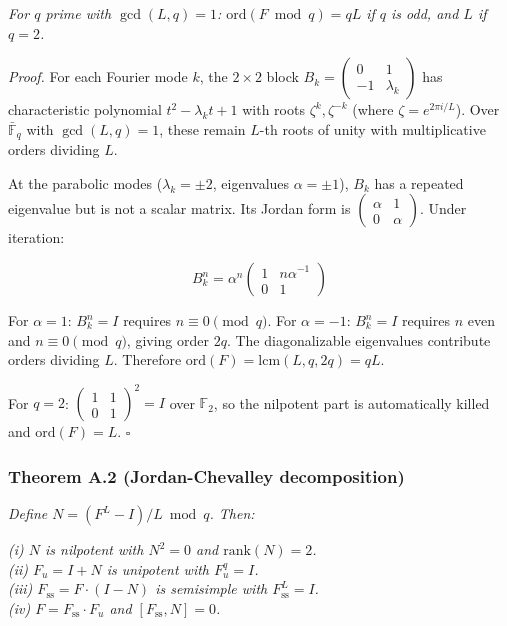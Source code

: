 \documentclass[
  11pt,
]{article}
\begin{document}
\emph{For \(q\) prime with \(\gcd(L, q) = 1\):
\(\mathrm{ord}(F \bmod q) = qL\) if \(q\) is odd, and \(L\) if
\(q = 2\).}

\emph{Proof.} For each Fourier mode \(k\), the \(2 \times 2\) block
\(B_k = \left(\begin{smallmatrix} 0 & 1 \\ -1 & \lambda_k \end{smallmatrix}\right)\)
has characteristic polynomial \(t^2 - \lambda_k t + 1\) with roots
\(\zeta^k, \zeta^{-k}\) (where \(\zeta = e^{2\pi i/L}\)). Over
\(\bar{\mathbb{F}}_q\) with \(\gcd(L, q) = 1\), these remain \(L\)-th
roots of unity with multiplicative orders dividing \(L\).

At the parabolic modes (\(\lambda_k = \pm 2\), eigenvalues
\(\alpha = \pm 1\)), \(B_k\) has a repeated eigenvalue but is not a
scalar matrix. Its Jordan form is
\(\left(\begin{smallmatrix} \alpha & 1 \\ 0 & \alpha \end{smallmatrix}\right)\).
Under iteration:

\[B_k^n = \alpha^n \begin{pmatrix} 1 & n\alpha^{-1} \\ 0 & 1 \end{pmatrix}\]

For \(\alpha = 1\): \(B_k^n = I\) requires \(n \equiv 0 \pmod{q}\). For
\(\alpha = -1\): \(B_k^n = I\) requires \(n\) even and
\(n \equiv 0 \pmod{q}\), giving order \(2q\). The diagonalizable
eigenvalues contribute orders dividing \(L\). Therefore
\(\mathrm{ord}(F) = \mathrm{lcm}(L, q, 2q) = qL\).

For \(q = 2\):
\(\left(\begin{smallmatrix} 1 & 1 \\ 0 & 1 \end{smallmatrix}\right)^2 = I\)
over \(\mathbb{F}_2\), so the nilpotent part is automatically killed and
\(\mathrm{ord}(F) = L\). \(\square\)

\hypertarget{theorem-a.2-jordan-chevalley-decomposition}{%
\subsubsection{Theorem A.2 (Jordan-Chevalley
decomposition)}\label{theorem-a.2-jordan-chevalley-decomposition}}

\emph{Define \(N = (F^L - I)/L \bmod q\). Then:}

\emph{(i) \(N\) is nilpotent with \(N^2 = 0\) and
\(\mathrm{rank}(N) = 2\).\\
(ii) \(F_u = I + N\) is unipotent with \(F_u^q = I\).\\
(iii) \(F_{\mathrm{ss}} = F \cdot (I - N)\) is semisimple with
\(F_{\mathrm{ss}}^L = I\).\\
(iv) \(F = F_{\mathrm{ss}} \cdot F_u\) and
\([F_{\mathrm{ss}}, N] = 0\).}
\end{document}
